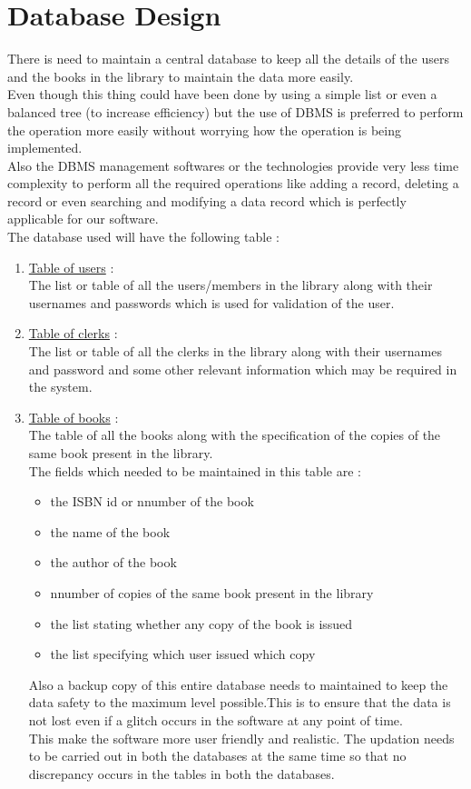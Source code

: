 \documentclass[a4paper]{article}
\begin{document}
\section{Database Design}
There is need to maintain a central database to keep all the details of the users and the books in the library to maintain the data more easily.\\
Even though this thing could have been done by using a simple list or even a balanced tree (to increase efficiency) but the use of DBMS is preferred to perform the operation more easily without worrying how the operation is being implemented.\\
Also the DBMS management softwares or the technologies provide very less time complexity to perform all the required operations like adding a record, deleting a record or even searching and modifying a data record which is perfectly applicable for our software.\\
The database used will have the following table : 
\begin{enumerate}
\item \underline{Table of users} :\\
The list or table of all the users/members in the library along with their usernames and passwords which is used for validation of the user.
\item \underline{Table of clerks} : \\
The list or table of all the clerks in the library along with their usernames and password and some other relevant information which may be required in the system.
\item \underline{Table of books} : \\
The table of all the books along with the specification of the copies of the same book present in the library.
\\The fields which needed to be maintained in this table are :
\begin{itemize}
\item the ISBN id or nnumber of the book
\item the name of the book
\item the author of the book
\item nnumber of copies of the same book present in the library
\item the list stating whether any copy of the book is issued
\item the list specifying which user issued which copy
\end{itemize}


Also a backup copy of this entire database needs to maintained to keep the data safety to the maximum level possible.This is to ensure that the data is not lost even if a glitch occurs in the software at any point of time.\\This make the software more user friendly and realistic.
The updation needs to be carried out in both the databases at the same time so that no discrepancy occurs in the tables in both the databases.
\\
\end{enumerate}
\end{document}

